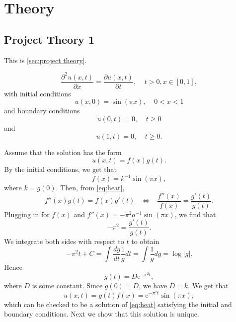 \section{Theory}\label{sec:Theory}




\subsection{Project Theory 1}\label{sec:project theory}
This is \autoref{sec:project theory}.

\begin{equation}\label{eq:heat}
\frac{\partial^2 u(x,t)}{\partial x}= \frac{\partial u(x,t)}{\partial t},\;\;\;\;t>0,x\in[0,1],
\end{equation}
with initial conditions
\begin{equation*}
    u(x,0)=\sin(\pi x),\;\;\;\;0<x<1
\end{equation*}
and boundary conditions
\begin{equation*}
    u(0,t)=0,\;\;\;\;t\ge0
\end{equation*}
and
\begin{equation*}
    u(1,t)=0,\;\;\;\;t\ge0.
\end{equation*}

Assume that the solution has the form
\begin{equation*}
    u(x,t)=f(x)g(t).
\end{equation*}
By the initial conditions, we get that
\begin{equation*}
    f(x)=k^{-1}\sin(\pi x),
\end{equation*}
where $k=g(0)$. Then, from \cref{eq:heat},
\begin{equation*}
    f''(x)g(t) = f(x)g'(t)\;\;\;\Leftrightarrow\;\;\;\frac{f''(x)}{f(x)}=\frac{g'(t)}{g(t)}.
\end{equation*}
Plugging in for $f(x)$ and $f''(x)=-\pi^2a^{-1}\sin(\pi x)$, we find that
\begin{equation*}
    -\pi^2 = \frac{g'(t)}{g(t)}.
\end{equation*}
We integrate both sides with respect to $t$ to obtain
\begin{equation*}
    -\pi^2t+C = \int\frac{dg}{dt}\frac{1}{g}dt = \int\frac{1}{g}dg =\log |g|.
\end{equation*}
Hence
\begin{equation*}
    g(t)=D\mathrm{e}^{-\pi^2 t},
\end{equation*}
where $D$ is some constant. Since $g(0)=D$, we have $D=k$. We get that
\begin{equation*}
    u(x,t)=g(t)f(x)=\mathrm{e}^{-\pi^2 t}\sin(\pi x),
\end{equation*}
which can be checked to be a solution of \cref{eq:heat} satisfying the initial and boundary conditions. Next we show that this solution is unique.

